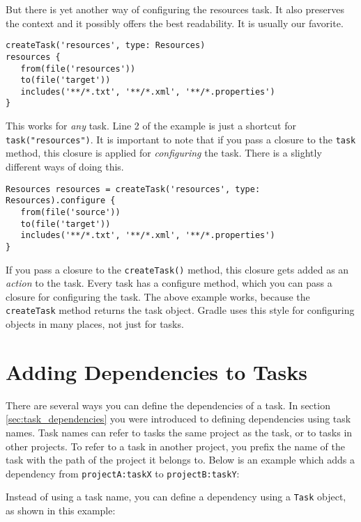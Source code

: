 But there is yet another way of configuring the resources task. It also preserves the context and it possibly offers the best readability. It is usually our favorite.
\begin{Verbatim}
createTask('resources', type: Resources)
resources {
   from(file('resources'))
   to(file('target'))
   includes('**/*.txt', '**/*.xml', '**/*.properties')
}
\end{Verbatim}
This works for \emph{any} task. Line 2 of the example is just a shortcut for \texttt{task("resources")}. It is important to note that if you pass a closure to the \texttt{task} method, this closure is applied for \emph{configuring} the task. There is a slightly different ways of doing this.
\begin{Verbatim}
Resources resources = createTask('resources', type: Resources).configure {
   from(file('source'))
   to(file('target'))
   includes('**/*.txt', '**/*.xml', '**/*.properties')
}	
\end{Verbatim}
If you pass a closure to the \texttt{createTask()} method, this closure gets added as an \emph{action} to the task. Every task has a configure method, which you can pass a closure for configuring the task. The above example works, because the \texttt{createTask} method returns the task object. Gradle uses this style for configuring objects in many places, not just for tasks.

\section{Adding Dependencies to Tasks}
\label{sec:adding_dependencies_to_tasks}
There are several ways you can define the dependencies of a task. In section \ref{sec:task_dependencies} you were
introduced to defining dependencies using task names. Task names can refer to tasks the same project as the task, or
to tasks in other projects. To refer to a task in another project, you prefix the name of the task with the path of the
project it belongs to. Below is an example which adds a dependency from \texttt{projectA:taskX} to
\texttt{projectB:taskY}:

Instead of using a task name, you can define a dependency using a \texttt{Task} object, as shown in this example:


